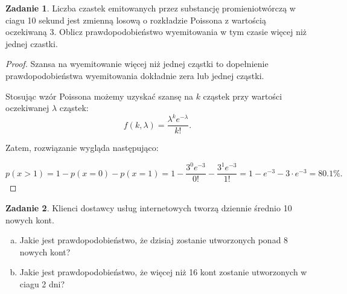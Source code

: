 \documentclass[11pt]{article}
\theoremstyle{definition}
\newtheorem{zadanie}{Zadanie}
\numberwithin{zadanie}{section}
\begin{document}
\begin{zadanie}
    Liczba czastek emitowanych przez substancję promieniotwórczą w ciagu 10 sekund jest zmienną losową o rozkładzie Poissona z wartością oczekiwaną 3.
    Oblicz prawdopodobieństwo wyemitowania w tym czasie więcej niż jednej czastki.
\end{zadanie}
\begin{proof}
    Szansa na wyemitowanie więcej niż jednej cząstki to dopełnienie prawdopodobieństwa wyemitowania dokładnie zera lub jednej cząstki.

    Stosując wzór Poissona możemy uzyskać szansę na $k$ cząstek przy wartości oczekiwanej $\lambda$ cząstek:
    $$f(k,\lambda) = \frac{\lambda^ke^{-\lambda}}{k!}.$$

    Zatem, rozwiązanie wygląda następująco:

    $$p(x>1) = 1 - p(x=0) - p(x=1) = 1 - \frac{3^0e^{-3}}{0!} - \frac{3^1e^{-3}}{1!} = 1-e^{-3}-3\cdot e^{-3} = 80.1\%.$$
\end{proof}
\begin{zadanie}
    Klienci dostawcy usług internetowych tworzą dziennie średnio 10 nowych kont.
    \begin{enumerate}[a)]
        \item Jakie jest prawdopodobieństwo, że dzisiaj zostanie utworzonych ponad 8 nowych kont?
        \item Jakie jest prawdopodobieństwo, że więcej niż 16 kont zostanie utworzonych w ciagu 2 dni?
    \end{enumerate}
\end{zadanie}
\end{document}
